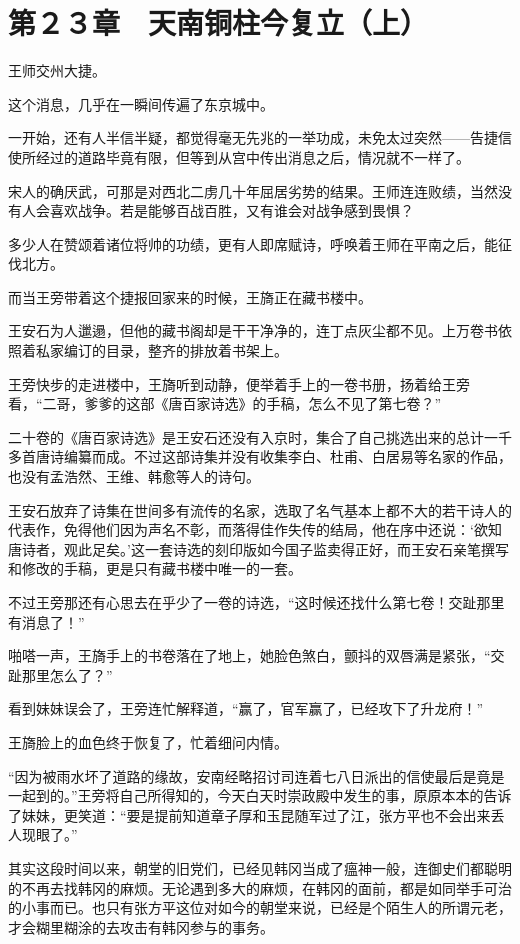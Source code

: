 \section{第２３章　天南铜柱今复立（上）}

王师交州大捷。

这个消息，几乎在一瞬间传遍了东京城中。

一开始，还有人半信半疑，都觉得毫无先兆的一举功成，未免太过突然——告捷信使所经过的道路毕竟有限，但等到从宫中传出消息之后，情况就不一样了。

宋人的确厌武，可那是对西北二虏几十年屈居劣势的结果。王师连连败绩，当然没有人会喜欢战争。若是能够百战百胜，又有谁会对战争感到畏惧？

多少人在赞颂着诸位将帅的功绩，更有人即席赋诗，呼唤着王师在平南之后，能征伐北方。

而当王旁带着这个捷报回家来的时候，王旖正在藏书楼中。

王安石为人邋遢，但他的藏书阁却是干干净净的，连丁点灰尘都不见。上万卷书依照着私家编订的目录，整齐的排放着书架上。

王旁快步的走进楼中，王旖听到动静，便举着手上的一卷书册，扬着给王旁看，“二哥，爹爹的这部《唐百家诗选》的手稿，怎么不见了第七卷？”

二十卷的《唐百家诗选》是王安石还没有入京时，集合了自己挑选出来的总计一千多首唐诗编纂而成。不过这部诗集并没有收集李白、杜甫、白居易等名家的作品，也没有孟浩然、王维、韩愈等人的诗句。

王安石放弃了诗集在世间多有流传的名家，选取了名气基本上都不大的若干诗人的代表作，免得他们因为声名不彰，而落得佳作失传的结局，他在序中还说：‘欲知唐诗者，观此足矣。’这一套诗选的刻印版如今国子监卖得正好，而王安石亲笔撰写和修改的手稿，更是只有藏书楼中唯一的一套。

不过王旁那还有心思去在乎少了一卷的诗选，“这时候还找什么第七卷！交趾那里有消息了！”

啪嗒一声，王旖手上的书卷落在了地上，她脸色煞白，颤抖的双唇满是紧张，“交趾那里怎么了？”

看到妹妹误会了，王旁连忙解释道，“赢了，官军赢了，已经攻下了升龙府！”

王旖脸上的血色终于恢复了，忙着细问内情。

“因为被雨水坏了道路的缘故，安南经略招讨司连着七八日派出的信使最后是竟是一起到的。”王旁将自己所得知的，今天白天时崇政殿中发生的事，原原本本的告诉了妹妹，更笑道：“要是提前知道章子厚和玉昆随军过了江，张方平也不会出来丢人现眼了。”

其实这段时间以来，朝堂的旧党们，已经见韩冈当成了瘟神一般，连御史们都聪明的不再去找韩冈的麻烦。无论遇到多大的麻烦，在韩冈的面前，都是如同举手可治的小事而已。也只有张方平这位对如今的朝堂来说，已经是个陌生人的所谓元老，才会糊里糊涂的去攻击有韩冈参与的事务。


